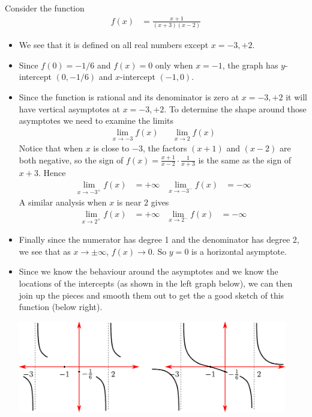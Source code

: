 \begin{eg}
 Consider the function
\begin{align*}
  f(x) &= \frac{x+1}{(x+3)(x-2)}
\end{align*}
\begin{itemize}
 \item We see that it is defined on all real numbers except $x=-3,+2$.
\item Since $f(0)=-1/6$ and $f(x)=0$ only when $x=-1$, the graph has $y$-intercept
$(0,-1/6)$ and $x$-intercept $(-1,0)$.

\item Since the function is rational and its denominator is zero at $x=-3,+2$ it will
have vertical asymptotes at $x=-3,+2$. To determine the shape around those
asymptotes we need to examine the limits
\begin{align*}
  \lim_{x\to -3} f(x) && \lim_{x\to2} f(x)
\end{align*}
Notice that when $x$ is close to $-3$, the factors $(x+1)$ and $(x-2)$ are both negative,
so the sign of $f(x) = \frac{x+1}{x-2} \cdot \frac{1}{x+3}$ is the same as the sign of
$x+3$. Hence
\begin{align*}
  \lim_{x\to -3^+} f(x) &= +\infty &
  \lim_{x\to -3^-} f(x) &= -\infty
\end{align*}
A similar analysis when $x$ is near $2$ gives
\begin{align*}
  \lim_{x\to 2^+} f(x) &= +\infty &
  \lim_{x\to 2^-} f(x) &= -\infty
\end{align*}

\item Finally since the numerator has degree 1 and the denominator has degree 2, we see
that as $x \to \pm \infty$, $f(x) \to 0$. So $y=0$ is a horizontal asymptote.

\item Since we know the behaviour around the asymptotes and we know the locations of the
intercepts (as shown in the left graph below), we can then join up the pieces
and smooth them out to get the a good sketch of this function (below right).
\begin{efig}
 \begin{center}
  \includegraphics[height=4cm]{extra/sketch0}
 \end{center}
\end{efig}

\end{itemize}


\end{eg}


